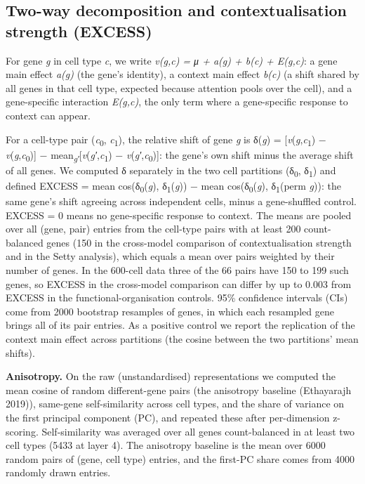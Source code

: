 \documentclass[
  11pt,
]{article}
\begin{document}
\subsection{Two-way decomposition and contextualisation strength
(EXCESS)}\label{two-way-decomposition-and-contextualisation-strength-excess}

For gene \emph{g} in cell type \emph{c}, we write \emph{v(g,c) = μ +
a(g) + b(c) + E(g,c)}: a gene main effect \emph{a(g)} (the gene's
identity), a context main effect \emph{b(c)} (a shift shared by all
genes in that cell type, expected because attention pools over the
cell), and a gene-specific interaction \emph{E(g,c)}, the only term
where a gene-specific response to context can appear.

For a cell-type pair (\emph{c}\textsubscript{0},
\emph{c}\textsubscript{1}), the relative shift of gene \emph{g} is
δ(\emph{g}) = {[}\emph{v}(\emph{g},\emph{c}\textsubscript{1}) −
\emph{v}(\emph{g},\emph{c}\textsubscript{0}){]} −
mean\textsubscript{\emph{g′}}{[}\emph{v}(\emph{g′},\emph{c}\textsubscript{1})
− \emph{v}(\emph{g′},\emph{c}\textsubscript{0}){]}: the gene's own shift
minus the average shift of all genes. We computed δ separately in the
two cell partitions (δ\textsubscript{0}, δ\textsubscript{1}) and defined
EXCESS = mean cos(δ\textsubscript{0}(\emph{g}),
δ\textsubscript{1}(\emph{g})) − mean cos(δ\textsubscript{0}(\emph{g}),
δ\textsubscript{1}(perm \emph{g})): the same gene's shift agreeing
across independent cells, minus a gene-shuffled control. EXCESS = 0
means no gene-specific response to context. The means are pooled over
all (gene, pair) entries from the cell-type pairs with at least 200
count-balanced genes (150 in the cross-model comparison of
contextualisation strength and in the Setty analysis), which equals a
mean over pairs weighted by their number of genes. In the 600-cell data
three of the 66 pairs have 150 to 199 such genes, so EXCESS in the
cross-model comparison can differ by up to 0.003 from EXCESS in the
functional-organisation controls. 95\% confidence intervals (CIs) come
from 2000 bootstrap resamples of genes, in which each resampled gene
brings all of its pair entries. As a positive control we report the
replication of the context main effect across partitions (the cosine
between the two partitions' mean shifts).

\textbf{Anisotropy.} On the raw (unstandardised) representations we
computed the mean cosine of random different-gene pairs (the anisotropy
baseline (Ethayarajh 2019)), same-gene self-similarity across cell
types, and the share of variance on the first principal component (PC),
and repeated these after per-dimension z-scoring. Self-similarity was
averaged over all genes count-balanced in at least two cell types (5433
at layer 4). The anisotropy baseline is the mean over 6000 random pairs
of (gene, cell type) entries, and the first-PC share comes from 4000
randomly drawn entries.
\end{document}
